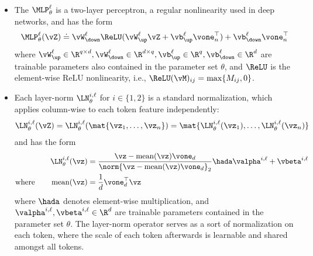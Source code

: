 \documentclass[../../book-main.tex]{subfiles}
\begin{document}
\begin{itemize}
\begin{eqnarray}
{            \ell}]^{\top}\vZ)
            \label{eq:attention_map}
        \end{eqnarray}
        are also known as the \textit{\(k\)th attention map} and
        \textit{\(k\)th attention head output} at layer \(\ell\),
        respectively. Furthermore, the operation \(\SA(\vQ, \vK,
        \vV)\) can be computed extremely efficiently using
        specialized software such as FlashAttention
        \citep{shah2025flashattention}.
    \item The \(\MLP_{\theta}^{\ell}\) is a two-layer perceptron, a
        regular nonlinearity used in deep networks, and has the form
        \begin{equation}
            \MLP_{\theta}^{\ell}(\vZ) \doteq
            \vW_{\down}^{\ell}\ReLU(\vW_{\up}^{\ell}\vZ +
            \vb_{\up}^{\ell}\vone_{n}^{\top}) +
            \vb_{\down}^{\ell}\vone_{n}^{\top}
        \end{equation}
        where \(\vW_{\up}^{\ell} \in \R^{q \times d},
            \vW_{\down}^{\ell} \in \R^{d \times q}, \vb_{\up}^{\ell} \in
        \R^{q}, \vb_{\down}^{\ell} \in \R^{d}\) are trainable
        parameters also contained in the parameter set \(\theta\),
        and \(\ReLU\) is the element-wise ReLU nonlinearity, i.e.,
        \(\ReLU(\vM)_{ij} = \max\{M_{ij}, 0\}\).
    \item Each layer-norm \(\LN_{\theta}^{i, \ell}\) for \(i \in \{1,
        2\}\) is a standard normalization, which applies column-wise
        to each token feature independently:
        \begin{equation}
            \LN_{\theta}^{i, \ell}(\vZ) = \LN_{\theta}^{i,
            \ell}(\mat{\vz_{1}, \dots, \vz_{n}}) =
            \mat{\LN_{\theta}^{i, \ell}(\vz_{1}), \dots,
            \LN_{\theta}^{i, \ell}(\vz_{n})}
        \end{equation}
        and has the form
        \begin{align}
            \LN_{\theta}^{i, \ell}(\vz)
            &= \frac{\vz
            - \operatorname{mean}(\vz)\vone_{d}}{\norm{\vz
            - \operatorname{mean}(\vz)\vone_{d}}_{2}} \hada
            \valpha^{i, \ell} + \vbeta^{i, \ell} \\
            \text{where}
            \qquad \operatorname{mean}(\vz) &= \frac{1}{d}\vone_{d}^{\top}\vz
        \end{align}
        where \(\hada\) denotes element-wise multiplication, and
        \(\valpha^{i, \ell}, \vbeta^{i, \ell} \in \R^{d}\) are
        trainable parameters contained in the parameter set
        \(\theta\). The layer-norm operator serves as a sort of
        normalization on each token, where the scale of each token
        afterwards is learnable and shared amongst all tokens.
\end{itemize}
\end{document}
